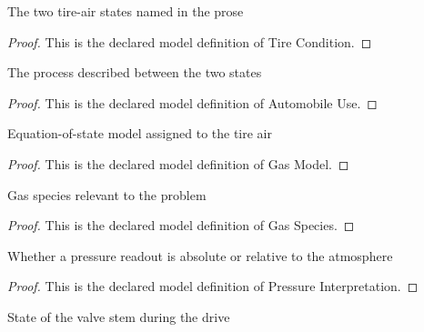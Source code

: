 \begin{definition}
  \label{def:physics:phyx-mini-0441:phyxminiproblems-problemphyxmini0441-tirecondition}
  The two tire-air states named in the prose
\end{definition}
\begin{proof}
  This is the declared model definition of Tire Condition.
\end{proof}
\begin{definition}
  \label{def:physics:phyx-mini-0441:phyxminiproblems-problemphyxmini0441-automobileuse}
  The process described between the two states
\end{definition}
\begin{proof}
  This is the declared model definition of Automobile Use.
\end{proof}
\begin{definition}
  \label{def:physics:phyx-mini-0441:phyxminiproblems-problemphyxmini0441-gasmodel}
  Equation-of-state model assigned to the tire air
\end{definition}
\begin{proof}
  This is the declared model definition of Gas Model.
\end{proof}
\begin{definition}
  \label{def:physics:phyx-mini-0441:phyxminiproblems-problemphyxmini0441-gasspecies}
  Gas species relevant to the problem
\end{definition}
\begin{proof}
  This is the declared model definition of Gas Species.
\end{proof}
\begin{definition}
  \label{def:physics:phyx-mini-0441:phyxminiproblems-problemphyxmini0441-pressureinterpretation}
  Whether a pressure readout is absolute or relative to the atmosphere
\end{definition}
\begin{proof}
  This is the declared model definition of Pressure Interpretation.
\end{proof}
\begin{definition}
  \label{def:physics:phyx-mini-0441:phyxminiproblems-problemphyxmini0441-valvecondition}
  State of the valve stem during the drive
\end{definition}
